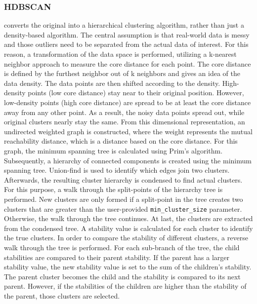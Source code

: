 \documentclass[12pt,a4paper,english]{article}
\begin{document}
	\subsubsection*{HDBSCAN}
    \hdbscan converts the original \dbscan \citep{dbscan:96} into a hierarchical clustering algorithm, rather than just a density-based algorithm.
	The central assumption is that real-world data is messy and those outliers need to be separated from the actual data of interest. For this reason, a transformation of the data space is performed, utilizing a k-nearest neighbor approach to measure the core distance for each point. The core distance is defined by the furthest neighbor out of k neighbors and gives an idea of the data density. The data points are then shifted according to the density. High-density points (low core distance) stay near to their original position. However, low-density points (high core distance) are spread to be at least the core distance away from any other point. As a result, the noisy data points spread out, while original clusters nearly stay the same.
	From this dimensional representation, an undirected weighted graph is constructed, where the weight represents the mutual reachability distance, which is a distance based on the core distance. For this graph, the minimum spanning tree is calculated using Prim's algorithm.
	Subsequently, a hierarchy of connected components is created using the minimum spanning tree. Union-find is used to identify which edges join two clusters.
	Afterwards, the resulting cluster hierarchy is condensed to find actual clusters. For this purpose, a walk through the split-points of the hierarchy tree is performed. New clusters are only formed if a split-point in the tree creates two clusters that are greater than the user-provided \texttt{min\_cluster\_size} parameter. Otherwise, the walk through the tree continues.
	At last, the clusters are extracted from the condensed tree. A stability value is calculated for each cluster to identify the true clusters. In order to compare the stability of different clusters, a reverse walk through the tree is performed. For each sub-branch of the tree, the child stabilities are compared to their parent stability. If the parent has a larger stability value, the new stability value is set to the sum of the children's stability. The parent cluster becomes the child and the stability is compared to its next parent.
	However, if the stabilities of the children are higher than the stability of the parent, those clusters are selected.
	
\end{document}
